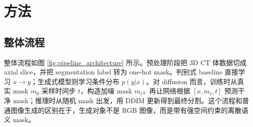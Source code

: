 \documentclass[lang=cn,11pt,a4paper]{elegantpaper}
\begin{document}
\section{方法}

\subsection{整体流程}

整体流程如图 \ref{fig:pipeline_architecture} 所示。预处理阶段把 3D CT 体数据切成 axial slice，并把 segmentation label 转为 one-hot mask。判别式 baseline 直接学习 $x\rightarrow y$；生成式模型则学习条件分布 $p(y|x)$。对 diffusion 而言，训练时从真实 mask $m_0$ 采样时间步 $t$，构造加噪 mask $m_t$，再让网络根据 $[x,m_t,t]$ 预测干净 mask；推理时从随机 mask 出发，用 DDIM 更新得到最终分割。这个流程和普通图像生成的区别在于，生成对象不是 RGB 图像，而是带有强空间约束的离散语义 mask。
\end{document}
